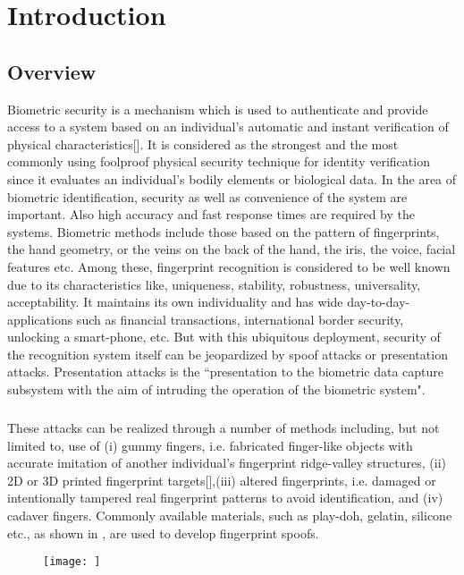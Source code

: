 \clearpage
{}
\clearpage
{}
\setcounter{page}{1}
\setcounter{secnumdepth}{3}
\pagestyle{fancy}
\cfoot{}
\rfoot{\textit{\thepage}}
\renewcommand{\footrulewidth}{0.4pt}
\chapter{Introduction}
\section{Overview}
Biometric security is a mechanism which is used to authenticate and provide access to a system based on  an individual's automatic and instant verification of physical characteristics[]. It is considered as the strongest and the most commonly using foolproof physical security technique for identity verification since it evaluates an individual's bodily elements or biological data.
In the area of biometric identification, security as well as convenience
of the system are important. Also high accuracy and fast response times are required by the systems. Biometric methods include those based on the pattern of fingerprints, the hand
geometry, or the veins on the back of the hand, the iris, the voice,  facial features etc. Among these, fingerprint recognition is considered to be well known due to its characteristics like, uniqueness, stability, robustness, universality, acceptability. It maintains its own individuality and has wide day-to-day-applications such as financial transactions, international border security, unlocking a smart-phone, etc. But with this ubiquitous deployment, security of the recognition system itself can be jeopardized by spoof attacks or presentation attacks. Presentation attacks is the ``presentation to the biometric data capture subsystem with the aim of intruding the operation of the biometric system".
\paragraph{}These attacks can be realized through a number of methods including, but not limited to, use of (i) gummy fingers, i.e. fabricated finger-like objects with accurate imitation of another individual's fingerprint ridge-valley structures, (ii) 2D or 3D printed fingerprint targets[],(iii) altered fingerprints, i.e. damaged or intentionally tampered real fingerprint patterns to avoid identification, and (iv) cadaver fingers. Commonly available materials, such as play-doh, gelatin, silicone etc., as shown in \cite{fig1}, are used to develop fingerprint spoofs. 
\begin{figure}[h]
\center
\texttt{[image: ]}   
\caption{}
\label{fig1}
\end{figure}
